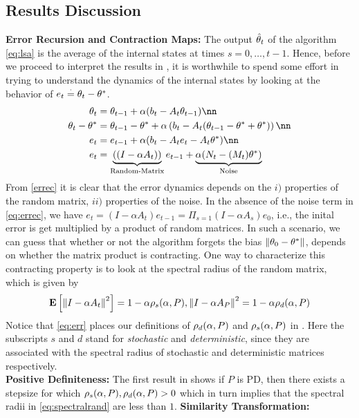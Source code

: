\subsection{Results Discussion}
\textbf{Error Recursion and Contraction Maps:}
The output $\hat{\theta}_t$ of the algorithm \eqref{eq:lsa} is the average of the internal states at times $s=0,\ldots,t-1$. Hence, before we proceed to interpret the results in , it is worthwhile to spend some effort in trying to understand the dynamics of the internal states by looking at the behavior of $e_t\stackrel{\cdot}{=} \theta_t-\theta^*$.
\begin{align}\label{eq:errec}
\theta_t&=\theta_{t-1}+\alpha(b_t-A_t\theta_{t-1})\nn\\
\theta_t-\ts&=\theta_{t-1}-\ts+\alpha\left(b_t-A_t(\theta_{t-1}-\ts+\ts)\right)\nn\\
e_t&=e_{t-1}+\alpha(b_t-A_t e_t -A_t\ts)\nn\\
e_t&=\underbrace{((I-\alpha A_t))}_{\text{Random-Matrix}} e_{t-1}+\underbrace{\alpha(N_t -(M_t)\ts)}_{\text{Noise}}
\end{align}
From \eqref{errec} it is clear that the error dynamics depends on the $i)$ properties of the random matrix, $ii)$ properties of the noise. In the absence of the noise term in \eqref{eq:errec}, we have $e_t=(I-\alpha A_t) e_{t-1}=\Pi_{s=1}(I-\alpha A_s) e_0$, i.e., the inital error is get multiplied by a product of random matrices. In such a scenario, we can guess that whether or not the algorithm forgets the bias $\left\| \theta_0-\theta^*\right\|$, depends on whether the matrix product is contracting. One way to characterize this contracting property is to look at the spectral radius of the random matrix, which is given by
\begin{align}\label{eq:spectralrand}
\mathbf{E}\left[\left\| I-\alpha A_t\right\|^2\right]=1-\alpha \rho_s(\alpha,P), {\left\| I-\alpha A_P\right\|^2}=1-\alpha \rho_d(\alpha,P)
\end{align}
Notice that \eqref{eq:err} places our definitions of $\rho_d(\alpha,P)$ and $\rho_s(\alpha,P)$ in . Here the subscripts $s$ and $d$ stand for \emph{stochastic} and \emph{deterministic}, since they are associated with the spectral radius of stochastic and deterministic matrices respectively.\\
\textbf{Positive Definiteness:} The first result in  shows if $P$ is PD, then there exists a stepsize for which $\rho_s(\alpha,P), \rho_d(\alpha,P)>0$ which in turn implies that the spectral radii in \eqref{eq:spectralrand} are less than $1$.
\textbf{Similarity Transformation:} 
